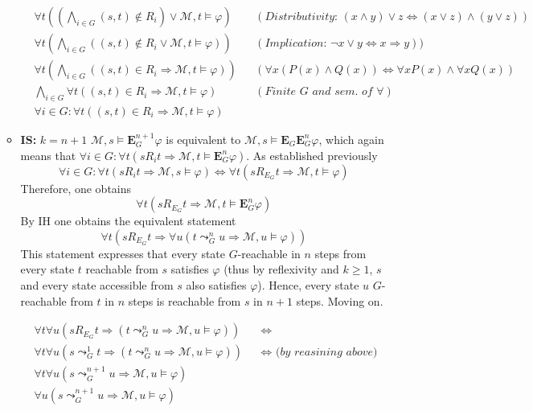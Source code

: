 \documentclass[11pt,a4paper]{article}
\newcommand{\egen}{\mathbf{E}}
\newcommand{\sto}{\Rightarrow}
\begin{document}
\begin{enumerate}
\begin{itemize}
\begin{align*}
& \forall t ((\bigwedge_{i \in G} (s,t) \nin R_i) \lor \mathcal{M},t \models \varphi) && (\textit{Distributivity: } (x \land y) \lor z \Leftrightarrow (x \lor z) \land (y \lor z))& \\
& \forall t (\bigwedge_{i \in G} ((s,t) \nin R_i \lor \mathcal{M},t \models \varphi)) && (\textit{Implication: } \neg x \lor y \Leftrightarrow x \sto y))& \\
& \forall t (\bigwedge_{i \in G} ((s,t) \in R_i \sto \mathcal{M},t \models \varphi)) && ( \forall x (P(x) \land Q(x)) \Leftrightarrow  \forall x P(x) \land \forall x Q(x))& \\
& \bigwedge_{i \in G}\forall t ((s,t) \in R_i \sto \mathcal{M},t \models \varphi) && (\textit{Finite G and sem. of } \forall)& \\
& \forall i \in G : \forall t ((s,t) \in R_i \sto \mathcal{M},t \models \varphi) && &
\end{align*}

\item \textbf{IS:} $k = n+1$
$\mathcal{M},s \models \egen_G^{n+1} \varphi$ is equivalent to $\mathcal{M},s \models \egen_G \egen_G^n \varphi$, which again means that $\forall i \in G : \forall t (sR_it \sto \mathcal{M}, t \models \egen_G^n \varphi)$. As established previously 
\begin{equation*}
\forall i \in G : \forall t (sR_it \sto \mathcal{M}, s \models \varphi) \iff \forall t (s R_{E_G} t \sto \mathcal{M},t \models \varphi)
\end{equation*}
Therefore, one obtains
\begin{equation*}
\forall t (s R_{E_G} t \sto \mathcal{M},t \models \egen_G^n \varphi)
\end{equation*}
By IH one obtains the equivalent statement 
\begin{equation*}
\forall t (s R_{E_G} t \sto \forall u (t \leadsto_G^n u \sto \mathcal{M},u \models \varphi))
\end{equation*}
This statement expresses that every state $G$-reachable in $n$ steps from every state $t$ reachable from $s$ satisfies $\varphi$ (thus by reflexivity and $k\geq 1$, $s$ and every state accessible from $s$ also satisfies $\varphi$). Hence, every state $u$ $G$-reachable from $t$ in $n$ steps is reachable from $s$ in $n+1$ steps. Moving on.

\begin{align*}
&\forall t \forall u (s R_{E_G} t \sto  (t \leadsto_G^n u \sto \mathcal{M},u \models \varphi))&& \iff&\\
&\forall t \forall u (s\leadsto_G^1 t \sto  (t \leadsto_G^n u \sto \mathcal{M},u \models \varphi))&& \iff \textit{ (by reasining above)}&\\
&\forall t \forall u (s \leadsto_G^{n+1} u \sto \mathcal{M},u \models \varphi)&& &\\
&\forall u (s \leadsto_G^{n+1} u \sto \mathcal{M},u \models \varphi)&& &
\end{align*}


\end{itemize}
\end{enumerate}
\end{document}
